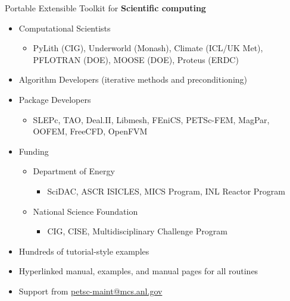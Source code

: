 \begin{frame}{Portable Extensible Toolkit for {\bf Scientific computing}}
  \begin{itemize}
  \item Computational Scientists
    \begin{itemize}
    \item PyLith (CIG), Underworld (Monash), Climate (ICL/UK Met), PFLOTRAN (DOE), MOOSE (DOE), Proteus (ERDC)
    \end{itemize}
  \item Algorithm Developers (iterative methods and preconditioning)
  \item Package Developers
    \begin{itemize}
    \item SLEPc, TAO, Deal.II, Libmesh, FEniCS, PETSc-FEM, MagPar, OOFEM, FreeCFD, OpenFVM
    \end{itemize}
  \item Funding
    \begin{itemize}\item Department of Energy
      \begin{itemize}\item SciDAC, ASCR ISICLES, MICS Program, INL Reactor Program
      \end{itemize}
    \item National Science Foundation
      \begin{itemize}\item CIG, CISE, Multidisciplinary Challenge Program
      \end{itemize}
    \end{itemize}
  \item Hundreds of tutorial-style examples
  \item Hyperlinked manual, examples, and manual pages for all routines
  \item Support from \url{petsc-maint@mcs.anl.gov}
\end{itemize}
\end{frame}
